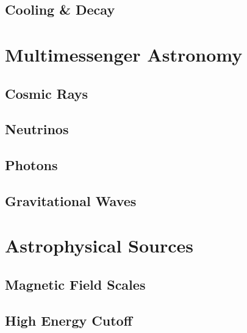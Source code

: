 \subsection{Cooling \& Decay}
\label{sub:cooling}



\section{Multimessenger Astronomy}
\label{sec:multimessenger}



\subsection{Cosmic Rays}
\label{sub:rays}



\subsection{Neutrinos}
\label{sub:neutrinos}



\subsection{Photons}
\label{sub:photons}



\subsection{Gravitational Waves}
\label{sub:gravitational}



\section{Astrophysical Sources}
\label{sec:sources}



\subsection{Magnetic Field Scales}
\label{sub:fields}



\subsection{High Energy Cutoff}
\label{sub:cutoff}



